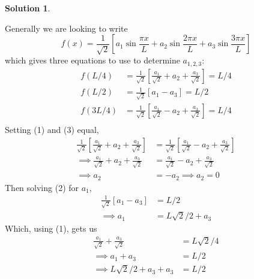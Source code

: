 \documentclass[10pt]{article}
\theoremstyle{definition}
\newtheorem{soln}{Solution}
\begin{document}
\begin{soln}
\begin{enumerate}[label=(\alph*)]
\begin{center}
          \end{center}
          Generally we are looking to write
          $$f(x)=\frac{1}{\sqrt{2}}\left[a_1\sin\frac{\pi x}{L}
              +a_2\sin\frac{2\pi x}{L}+a_3\sin\frac{3\pi x}{L}
              \right]$$
          which gives three equations to use to determine $a_{1,2,3}$:
          \begin{align}
            f(L/4)  & =\frac{1}{\sqrt{2}}\left[\frac{a_1}{\sqrt{2}}+a_2+\frac{a_3}{\sqrt{2}}\right]=L/4 \\
            f(L/2)  & =\frac{1}{\sqrt{2}}\left[a_1-a_3\right]=L/2                                       \\
            f(3L/4) & =\frac{1}{\sqrt{2}}\left[\frac{a_1}{\sqrt{2}}-a_2+\frac{a_3}{\sqrt{2}}\right]=L/4 \\
          \end{align}
          Setting (1) and (3) equal,
          \begin{align*}
            \frac{1}{\sqrt{2}}\left[\frac{a_1}{\sqrt{2}}+a_2+\frac{a_3}{\sqrt{2}}\right] & =\frac{1}{\sqrt{2}}\left[\frac{a_1}{\sqrt{2}}-a_2+\frac{a_3}{\sqrt{2}}\right] \\
            \implies  \frac{a_1}{\sqrt{2}}+a_2+\frac{a_3}{\sqrt{2}}                      & =\frac{a_1}{\sqrt{2}}-a_2+\frac{a_3}{\sqrt{2}}                                \\
            \implies  a_2                                                                & =-a_2\implies a_2=0
          \end{align*}
          Then solving (2) for $a_1$,
          \begin{align*}
            \frac{1}{\sqrt{2}}\left[a_1-a_3\right] & =L/2             \\
            \implies  a_1                          & =L\sqrt{2}/2+a_3
          \end{align*}
          Which, using (1), gets us
          \begin{align*}
            \frac{a_1}{\sqrt{2}}+\frac{a_3}{\sqrt{2}} & =L\sqrt{2}/4                            \\
            \implies a_1+a_3                          & =L/2                                    \\
            \implies L\sqrt{2}/2+a_3 +a_3             & =L/2                                    \\

\end{align*}
\end{enumerate}
\end{soln}
\end{document}
